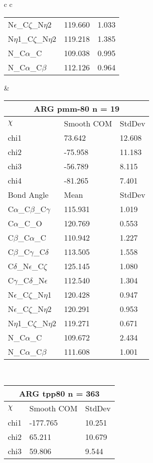 \begin{longtable}{ c c }
\begin{tabular}{ l l l }
  N$\epsilon$\_C$\zeta$\_N$\eta$2 & 119.660 & 1.033\\
  N$\eta$1\_C$\zeta$\_N$\eta$2 & 119.218 & 1.385\\
  N\_C$\alpha$\_C & 109.038 & 0.995\\
  N\_C$\alpha$\_C$\beta$ & 112.126 & 0.964\\
  \bottomrule
  \end{tabular}
  &
  \begin{tabular}{ l l l }
  \toprule
  \multicolumn{3}{c}{ARG \textbf{pmm-80} n = 19} \\ \toprule
  $\chi$       & Smooth COM & StdDev \\ \midrule
  chi1 & 73.642 & 12.608 \\ 
  chi2 & -75.958 & 11.183 \\ 
  chi3 & -56.789 & 8.115 \\ 
  chi4 & -81.265 & 7.401 \\ \midrule
  Bond Angle   & Mean     & StdDev \\ \midrule
  C$\alpha$\_C$\beta$\_C$\gamma$ & 115.931 & 1.019\\
  C$\alpha$\_C\_O & 120.769 & 0.553\\
  C$\beta$\_C$\alpha$\_C & 110.942 & 1.227\\
  C$\beta$\_C$\gamma$\_C$\delta$ & 113.505 & 1.558\\
  C$\delta$\_N$\epsilon$\_C$\zeta$ & 125.145 & 1.080\\
  C$\gamma$\_C$\delta$\_N$\epsilon$ & 112.540 & 1.304\\
  N$\epsilon$\_C$\zeta$\_N$\eta$1 & 120.428 & 0.947\\
  N$\epsilon$\_C$\zeta$\_N$\eta$2 & 120.291 & 0.953\\
  N$\eta$1\_C$\zeta$\_N$\eta$2 & 119.271 & 0.671\\
  N\_C$\alpha$\_C & 109.672 & 2.434\\
  N\_C$\alpha$\_C$\beta$ & 111.608 & 1.001\\
  \bottomrule
  \end{tabular}
  \\
  \begin{tabular}{ l l l }
  \toprule
  \multicolumn{3}{c}{ARG \textbf{tpp80} n = 363} \\ \toprule
  $\chi$       & Smooth COM & StdDev \\ \midrule
  chi1 & -177.765 & 10.251 \\ 
  chi2 & 65.211 & 10.679 \\ 
  chi3 & 59.806 & 9.544 \\ 

\end{tabular}
\end{longtable}
